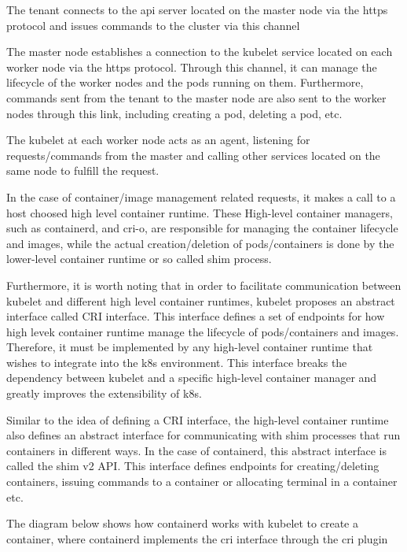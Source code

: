     The tenant connects to the api server located on the master node via the https protocol and issues commands to the cluster via this channel
    
    The master node establishes a connection to the kubelet service located on each worker node via the https protocol. Through this channel, it can manage the lifecycle of the worker nodes and the pods running on them. Furthermore, commands sent from the tenant to the master node 
    are also sent to the worker nodes through this link, including creating a pod, deleting a pod, etc.
    
    The kubelet at each worker node acts as an agent, listening for requests/commands from the master and calling other services located on the same node to fulfill the request.
    
    In the case of container/image management related requests, it makes a call to a host choosed high level container runtime.
    These High-level container managers, such as containerd, and cri-o, are responsible for managing the container lifecycle and images, while the actual creation/deletion of pods/containers is done by the lower-level container runtime or so called shim process.

    Furthermore, it is worth noting that in order to facilitate communication between kubelet and different high level container runtimes, kubelet proposes an abstract interface called CRI interface. This interface defines a set 
    of endpoints for how high levek container runtime manage the lifecycle of pods/containers and images. Therefore, it must be implemented by any high-level container runtime that wishes to integrate into the k8s environment. This interface breaks the dependency between kubelet 
    and a specific high-level container manager and greatly improves the extensibility of k8s.
    
    Similar to the idea of defining a CRI interface, the high-level container runtime also defines an abstract interface for communicating with shim processes that run containers in different ways. In the case of containerd, this abstract interface is called the shim v2 API. 
    This interface defines endpoints for creating/deleting containers, issuing commands to a container or allocating terminal in a container etc.




    The diagram below shows how containerd works with kubelet to create a container, where containerd implements the cri interface through the cri plugin


